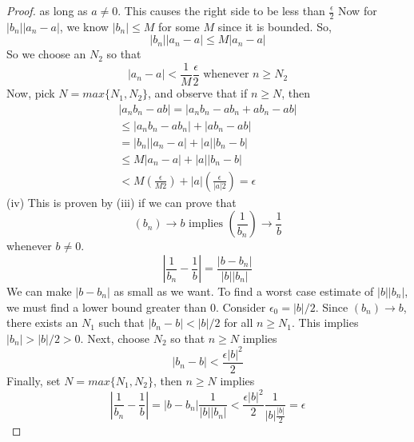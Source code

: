 \begin{proof}
            as long as $a \neq 0$. This causes the right side to be less than $\frac{\epsilon}{2}$ Now for $|b_n||a_n - a|$, we know $|b_n| \leq M$ for some $M$ since it is bounded. So, 
            $$|b_n||a_n - a| \leq M|a_n - a|$$
            So we choose an $N_2$ so that
            $$|a_n - a| < \frac{1}{M}\frac{\epsilon}{2} \text{ whenever } n \geq N_2$$
            Now, pick $N = max\{N_1, N_2\}$, and observe that if $n \geq N$, then
            \begin{align*}
                |a_nb_n - ab| = |a_nb_n - ab_n + ab_n - ab| \\
                \leq |a_nb_n - ab_n| + |ab_n - ab| \\
                = |b_n||a_n - a| + |a||b_n - b| \\
                \leq M|a_n - a| + |a||b_n - b| \\
                < M(\frac{\epsilon}{M2}) + |a|(\frac{\epsilon}{|a|2}) = \epsilon
            \end{align*}
        (iv) This is proven by (iii) if we can prove that
            $$(b_n) \rightarrow b \text{ implies } (\frac{1}{b_n}) \rightarrow \frac{1}{b}$$
            whenever $b \neq 0$.
            $$|\frac{1}{b_n} - \frac{1}{b}| = \frac{|b - b_n|}{|b||b_n|}$$
            We can make $|b - b_n|$ as small as we want. To find a worst case estimate of $|b||b_n|$, we must find a lower bound greater than 0. Consider $\epsilon_0 = |b|/2$. Since $(b_n) \rightarrow b$, there exists an $N_1$ such that $|b_n - b| < |b|/2$ for all $n \geq N_1$. This implies $|b_n| > |b|/2 > 0$. 
            \newline \indent
            Next, choose $N_2$ so that $n \geq N$ implies
            $$|b_n - b| < \frac{\epsilon|b|^2}{2}$$
            Finally, set $N = max\{N_1, N_2\}$, then $n \geq N$ implies
            $$|\frac{1}{b_n} - \frac{1}{b}| = |b - b_n|\frac{1}{|b||b_n|} < \frac{\epsilon|b|^2}{2}\frac{1}{|b|\frac{|b|}{2}} = \epsilon$$
    \end{proof}

